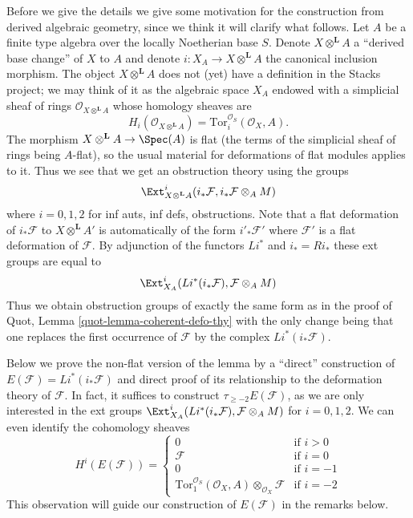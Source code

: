 \medskip\noindent
Before we give the details we give some motivation for the construction
from derived algebraic geometry, since we think it will clarify what
follows. Let $A$ be a finite type algebra over the locally Noetherian
base $S$. Denote $X \otimes^\mathbf{L} A$ a ``derived base change''
of $X$ to $A$ and denote $i : X_A \to X \otimes^\mathbf{L} A$ the
canonical inclusion morphism. The object $X \otimes^\mathbf{L} A$
does not (yet) have a definition in the Stacks project; we may think of it
as the algebraic space $X_A$ endowed with a simplicial sheaf of rings
$\mathcal{O}_{X \otimes^\mathbf{L} A}$ whose homology sheaves are
$$
H_i(\mathcal{O}_{X \otimes^\mathbf{L} A}) =
\text{Tor}^{\mathcal{O}_S}_i(\mathcal{O}_X, A).
$$
The morphism $X \otimes^\mathbf{L} A \to \Spec(A)$ is flat
(the terms of the simplicial sheaf of rings being $A$-flat),
so the usual material for deformations of flat modules applies to it.
Thus we see that we get an obstruction theory using the groups
$$
\Ext^i_{X \otimes^\mathbf{L} A}(i_*\mathcal{F},
i_*\mathcal{F} \otimes_A M)
$$
where $i = 0, 1, 2$ for inf auts, inf defs, obstructions. Note that
a flat deformation of $i_*\mathcal{F}$ to $X \otimes^\mathbf{L} A'$
is automatically of the form $i'_*\mathcal{F}'$ where $\mathcal{F}'$
is a flat deformation of $\mathcal{F}$. By adjunction
of the functors $Li^*$ and $i_* = Ri_*$ these ext groups are equal to
$$
\Ext^i_{X_A}(Li^*(i_*\mathcal{F}), \mathcal{F} \otimes_A M)
$$
Thus we obtain obstruction groups of exactly the same form as in the
proof of Quot, Lemma \ref{quot-lemma-coherent-defo-thy}
with the only change being
that one replaces the first occurrence of $\mathcal{F}$ by the complex
$Li^*(i_*\mathcal{F})$.

\medskip\noindent
Below we prove the non-flat version of the lemma by a ``direct''
construction of $E(\mathcal{F}) = Li^*(i_*\mathcal{F})$ and direct
proof of its relationship to the deformation theory of $\mathcal{F}$.
In fact, it suffices to construct $\tau_{\geq -2}E(\mathcal{F})$, as we
are only interested in the ext groups
$\Ext^i_{X_A}(Li^*(i_*\mathcal{F}), \mathcal{F} \otimes_A M)$
for $i = 0, 1, 2$. We can even identify the cohomology sheaves
$$
H^i(E(\mathcal{F})) =
\left\{
\begin{matrix}
0 & \text{if }i > 0 \\
\mathcal{F} & \text{if } i = 0 \\
0 & \text{if } i = -1 \\
\text{Tor}_1^{\mathcal{O}_S}(\mathcal{O}_X, A)
\otimes_{\mathcal{O}_X} \mathcal{F} &
\text{if } i = -2
\end{matrix}
\right.
$$
This observation will guide our construction of $E(\mathcal{F})$
in the remarks below.

